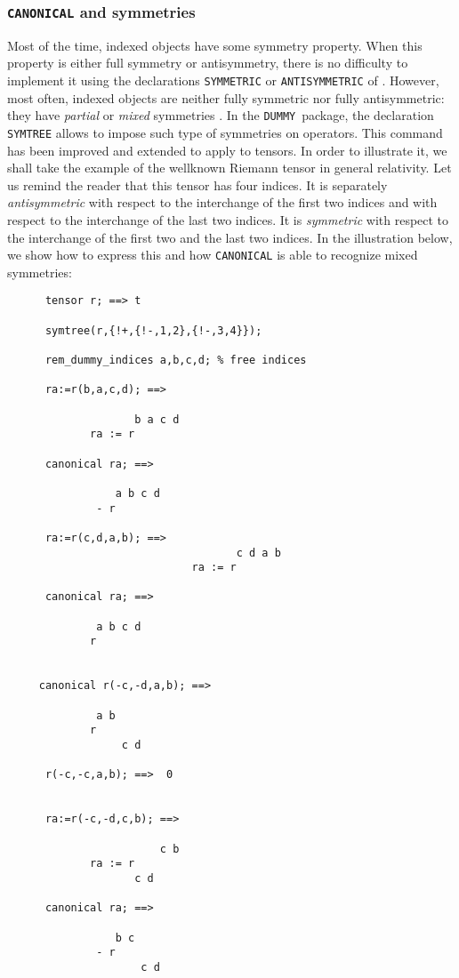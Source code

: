 \subsubsection{\texttt{CANONICAL} and symmetries} 

Most of the time, indexed objects have some symmetry property.
When this property is either full symmetry or antisymmetry, there
is no difficulty to implement it using the declarations 
\texttt{SYMMETRIC} or 
\texttt{ANTISYMMETRIC}
of \REDUCE. However, most often, indexed objects are neither 
fully symmetric nor fully antisymmetric: they have \emph{partial} 
or \emph{mixed} symmetries%
.
In the \texttt{DUMMY}\ package, the declaration 
\texttt{SYMTREE} allows to impose such type of symmetries 
on operators. This command has been improved and extended to 
apply to tensors.
In order to illustrate it, we shall take the example of the 
wellknown Riemann tensor in general relativity.
 Let us remind the reader
that this tensor has four indices. It is separately \emph{antisymmetric} with 
respect to the interchange of the first two indices and with respect to the   
interchange of the last two indices. It is \emph{symmetric} with respect to 
the interchange of the first two and the last two indices.
In the illustration below, we show how to express this and how 
\texttt{CANONICAL} is able to recognize mixed symmetries:  
\begin{verbatim}
      tensor r; ==> t

      symtree(r,{!+,{!-,1,2},{!-,3,4}});

      rem_dummy_indices a,b,c,d; % free indices
   
      ra:=r(b,a,c,d); ==>

                    b a c d
             ra := r

      canonical ra; ==>

                 a b c d
              - r

      ra:=r(c,d,a,b); ==>
                                    c d a b
                             ra := r

      canonical ra; ==>

              a b c d
             r


     canonical r(-c,-d,a,b); ==>

              a b
             r
                  c d

      r(-c,-c,a,b); ==>  0


      ra:=r(-c,-d,c,b); ==>

                        c b
             ra := r
                    c d

      canonical ra; ==>

                 b c
              - r
                     c d
\end{verbatim}
